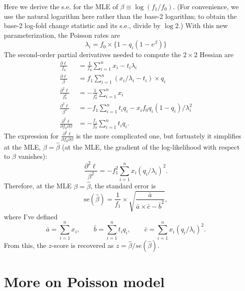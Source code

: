 \documentclass[final]{siamart171218}
\begin{document}
Here we derive the s.e. for the MLE of $\beta \equiv \log
(f_1/f_0)$. (For convenience, we use the natural logarithm here rather
than the base-2 logarithm; to obtain the base-2 log-fold change
statistic and its s.e., divide by $\log 2$.) With this new
parameterization, the Poisson rates are
\begin{equation}
\lambda_i = f_0 \times \{1 - q_i(1-e^{\beta})\}
\end{equation}
The second-order partial derivatives needed to compute the $2 \times
2$ Hessian are
\begin{align}
\frac{\partial\ell}{f_0} &= \frac{1}{f_0} \sum_{i=1}^n 
x_i - t_i\lambda_i \\
\frac{\partial\ell}{\beta} &= f_1 \sum_{i=1}^n 
(x_i/\lambda_i - t_i) \times q_i \\
\frac{\partial^2\ell}{f_0^2} &=
-\frac{1}{f_0^2} \sum_{i=1}^n x_i \\
\frac{\partial^2\ell}{\beta^2} &= 
-f_1 \sum_{i=1}^n t_i q_i - x_i f_0 q_i (1-q_i)/\lambda_i^2 \\
\frac{\partial^2\ell}{\partial f_0 \partial\beta} &= 
-\frac{f_1}{f_0} \sum_{i=1}^n t_i q_i.
\end{align}
The expression for $\frac{\partial^2\ell}{\partial f_0 \partial\beta}$
is the more complicated one, but fortuately it simplifies at the MLE,
$\beta = \hat{\beta}$ (at the MLE, the gradient of the log-likelihood
with respect to $\beta$ vanishes):
\begin{equation}
\frac{\partial^2\ell}{\beta^2} = -f_1^2 \sum_{i=1}^n x_i (q_i/\lambda_i)^2.
\end{equation}
Therefore, at the MLE $\beta = \hat{\beta}$, the standard error is
\begin{equation}
\mathrm{se}(\hat{\beta}) = \frac{1}{f_1} \times 
\sqrt{\frac{\bar{a}}{\bar{a} \times \bar{c} - \bar{b}^2}},
\end{equation}
where I've defined
\begin{equation*}
\bar{a} = \sum_{i=1}^n x_i, \qquad
\bar{b} = \sum_{i=1}^n t_i q_i, \qquad
\bar{c} = \sum_{i=1}^n x_i (q_i/\lambda_i)^2.
\end{equation*}
From this, the $z$-score is recovered as $z =
\hat{\beta}/se(\hat{\beta})$.

\appendix

\section{More on Poisson model}
\end{document}

